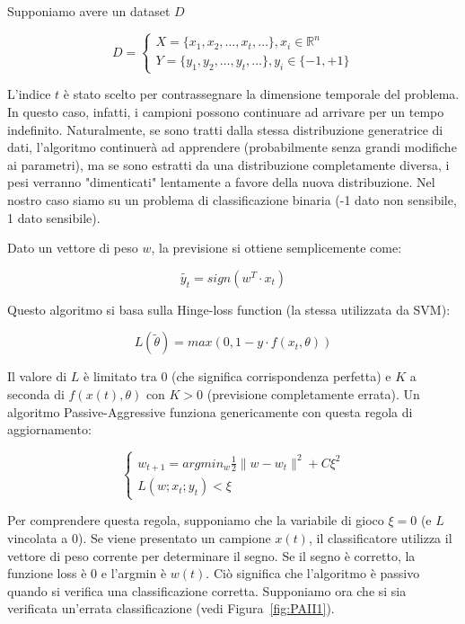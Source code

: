 Supponiamo avere un dataset $D$

$$D=\left\{
                \begin{array}{ll}
                  X=\{x_1,x_2,\dots ,x_t,\dots \}, x_i \in \mathbb{R}^n \\
                  Y=\{y_1,y_2,\dots ,y_t,\dots\}, y_i \in \{-1,+1\}
                \end{array}
              \right.$$

L'indice $t$ è stato scelto per contrassegnare la dimensione temporale del problema. In questo caso, infatti, i campioni possono continuare ad arrivare per un tempo indefinito. Naturalmente, se sono tratti dalla stessa distribuzione generatrice di dati, l'algoritmo continuerà ad apprendere (probabilmente senza grandi modifiche ai parametri), ma se sono estratti da una distribuzione completamente diversa, i pesi verranno "dimenticati" lentamente a favore della nuova distribuzione. Nel nostro caso siamo su un problema di classificazione binaria (-1 dato non sensibile, 1 dato sensibile).

Dato un vettore di peso $w$, la previsione si ottiene semplicemente come:

$$\tilde{y_t}=sign(w^T\cdot x_t)$$

Questo algoritmo si basa sulla Hinge-loss function (la stessa utilizzata da SVM):

$$L(\tilde{\theta})=max(0,1-y\cdot f(x_t,\theta))$$

Il valore di $L$ è limitato tra $0$ (che significa corrispondenza perfetta) e $K$ a seconda di $f(x(t), \theta)$ con $K > 0$ (previsione completamente errata). Un algoritmo Passive-Aggressive funziona genericamente con questa regola di aggiornamento:

$$\left\{
                \begin{array}{ll}
                  w_{t+1}=argmin_w\frac{1}{2}\| w-w_t\|^2 +C\xi^2\\
                  L(w;x_t;y_t) < \xi
                \end{array}
              \right.$$
              
Per comprendere questa regola, supponiamo che la variabile di gioco $\xi = 0$ (e $L$ vincolata a $0$). Se viene presentato un campione $x(t)$, il classificatore utilizza il vettore di peso corrente per determinare il segno. Se il segno è corretto, la funzione loss è $0$ e l'argmin è $w(t)$. Ciò significa che l'algoritmo è passivo quando si verifica una classificazione corretta. Supponiamo ora che si sia verificata un'errata classificazione (vedi Figura~\ref{fig:PAII1}).            
              
